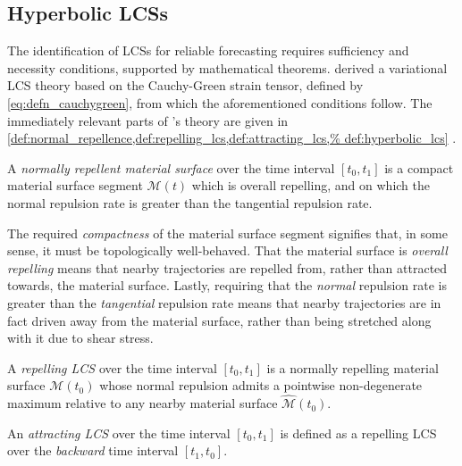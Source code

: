 \subsection{Hyperbolic LCSs}
\label{sub:hyperbolic_lcss}

The identification of LCSs for reliable forecasting requires sufficiency and
necessity conditions, supported by mathematical theorems.
\textcite{haller2010variational} derived a variational LCS theory based on
the Cauchy-Green strain tensor, defined by \cref{eq:defn_cauchygreen}, from
which the aforementioned conditions follow. The immediately relevant parts
of \citeauthor{haller2010variational}'s theory are given in
\cref{def:normal_repellence,def:repelling_lcs,def:attracting_lcs,%
def:hyperbolic_lcs} \parencite{haller2010variational}.

\begin{defn}
    \label{def:normal_repellence}
    A \emph{normally repellent material surface} over the time interval
    $[t_{0},t_{1}]$ is a compact material surface segment $\mathcal{M}(t)$
    which is overall repelling, and on which the normal repulsion rate is
    greater than the tangential repulsion rate.
\end{defn}

The required \emph{compactness} of the material surface segment signifies that,
in some sense, it must be topologically well-behaved. That the material surface
is \emph{overall repelling} means that nearby trajectories are repelled from,
rather than attracted towards, the material surface. Lastly, requiring that the
\emph{normal} repulsion rate is greater than the \emph{tangential} repulsion
rate means that nearby trajectories are in fact driven away from the material
surface, rather than being stretched along with it due to shear stress.

\begin{defn}
    \label{def:repelling_lcs}
    A \emph{repelling LCS} over the time interval $[t_{0},t_{1}]$ is a
    normally repelling material surface $\mathcal{M}(t_{0})$ whose normal repulsion
    admits a pointwise non-degenerate maximum relative to any nearby material
    surface $\widehat{\mathcal{M}}(t_{0})$.
\end{defn}

\begin{defn}
    \label{def:attracting_lcs}
    An \emph{attracting LCS} over the time interval $[t_{0},t_{1}]$ is defined
    as a repelling LCS over the \emph{backward} time interval $[t_{1},t_{0}]$.
\end{defn}

